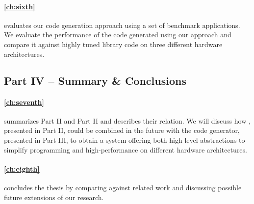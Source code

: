 \paragraph{\autoref{ch:sixth}} evaluates our code generation approach using a set of benchmark applications.
We evaluate the performance of the code generated using our approach and compare it against highly tuned library code on three different hardware architectures.

\subsection*{Part IV -- Summary \& Conclusions}

\paragraph{\autoref{ch:seventh}} summarizes Part II and Part II and describes their relation.
We will discuss how \SkelCL, presented in Part II, could be combined in the future with the code generator, presented in Part III, to obtain a system offering both high-level abstractions to simplify programming and high-performance on different hardware architectures.

\paragraph{\autoref{ch:eighth}} concludes the thesis by comparing against related work and discussing possible future extensions of our research.

